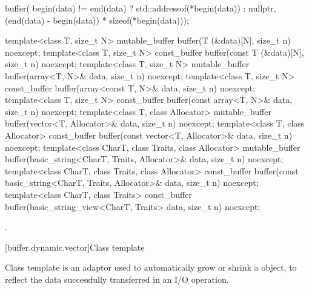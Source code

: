 \begin{itemdescr}
\pnum
\returns
\begin{codeblock}
buffer(
  begin(data) != end(data) ? std::addressof(*begin(data)) : nullptr,
  (end(data) - begin(data)) * sizeof(*begin(data)));
\end{codeblock}

\end{itemdescr}

\begin{itemdecl}
template<class T, size_t N>
  mutable_buffer buffer(T (&data)[N], size_t n) noexcept;
template<class T, size_t N>
  const_buffer buffer(const T (&data)[N], size_t n) noexcept;
template<class T, size_t N>
  mutable_buffer buffer(array<T, N>& data, size_t n) noexcept;
template<class T, size_t N>
  const_buffer buffer(array<const T, N>& data, size_t n) noexcept;
template<class T, size_t N>
  const_buffer buffer(const array<T, N>& data, size_t n) noexcept;
template<class T, class Allocator>
  mutable_buffer buffer(vector<T, Allocator>& data, size_t n) noexcept;
template<class T, class Allocator>
  const_buffer buffer(const vector<T, Allocator>& data, size_t n) noexcept;
template<class CharT, class Traits, class Allocator>
  mutable_buffer buffer(basic_string<CharT, Traits, Allocator>& data,
                        size_t n) noexcept;
template<class CharT, class Traits, class Allocator>
  const_buffer buffer(const basic_string<CharT, Traits, Allocator>& data,
                      size_t n) noexcept;
template<class CharT, class Traits>
  const_buffer buffer(basic_string_view<CharT, Traits> data,
                      size_t n) noexcept;
\end{itemdecl}

\begin{itemdescr}
\pnum
\returns {}.
\end{itemdescr}



[buffer.dynamic.vector]{Class template }

%
\pnum
Class template  is an adaptor used to automatically grow or shrink a  object, to reflect the data successfully transferred in an I/O operation.

